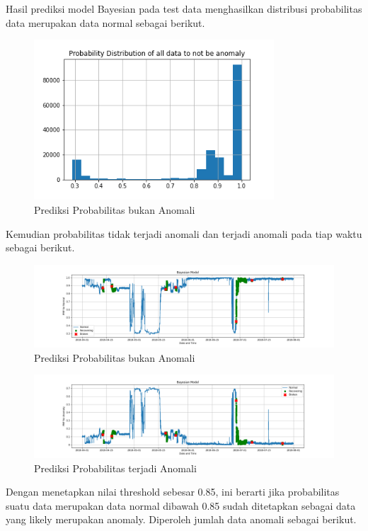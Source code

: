 Hasil prediksi model Bayesian pada test data menghasilkan distribusi probabilitas data merupakan data normal sebagai berikut.
\begin{figure}[h]
    \centering
    \includegraphics[width=0.8\textwidth]{resources/Bayes/Bayes_ProbDist.png}
    \caption{Prediksi Probabilitas bukan Anomali}
\end{figure}
Kemudian probabilitas tidak terjadi anomali dan terjadi anomali pada tiap waktu sebagai berikut.
\begin{figure}[h]
    \centering
    \includegraphics[width=\textwidth]{resources/Bayes/Bayes_normal_PMF.png}
    \caption{Prediksi Probabilitas bukan Anomali}
\end{figure}
\begin{figure}[h]
    \centering
    \includegraphics[width=\textwidth]{resources/Bayes/Bayes_anomaly_PMF.png}
    \caption{Prediksi Probabilitas terjadi Anomali}
\end{figure}
Dengan menetapkan nilai threshold sebesar 0.85, ini berarti jika probabilitas suatu data merupakan data normal dibawah 0.85 sudah ditetapkan sebagai data yang likely merupakan anomaly. Diperoleh jumlah data anomali sebagai berikut.
